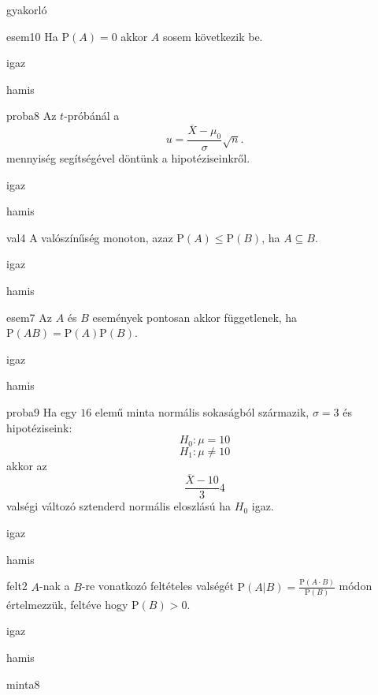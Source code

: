 \documentclass[12pt]{article}
\begin{document}
\begin{quiz}{gyakorló}

\begin{multi}[feedback={Például: legyen a kísérlet random húzás a $[0,1]$-ből és $A=\{\frac{1}{2}\}$}]{esem10}
Ha $\mathrm{P}(A)=0$ akkor $A$ sosem következik be.
\item igaz
\item* hamis
\end{multi}
\begin{multi}[feedback={A fenti formula a $u$-próba ún. próbastatisztikája.}]{proba8}
Az $t$-próbánál a 
$$
u=\frac{\overline{X}-\mu_0}{\sigma}\sqrt{n}.
$$
mennyiség segítségével döntünk a hipotéziseinkről.
\item igaz
\item* hamis
\end{multi}
\begin{multi}[feedback={$B=A\cup (B\setminus A)$+additívitás}]{val4}
A valószínűség monoton, azaz $\mathrm{P}(A)\le \mathrm{P}(B)$, ha $A\subseteq B$.
\item* igaz
\item hamis
\end{multi}
\begin{multi}[feedback={Definíció.}]{esem7}
Az $A$ és $B$ események pontosan akkor függetlenek, ha $\mathrm{P}(AB)=\mathrm{P}(A)\mathrm{P}(B)$.
\item* igaz
\item hamis
\end{multi}
\begin{multi}[feedback={Igen, éppen ez alapján tudunk dönteni. Ahhoz képest hogy sztenderd normális átlagos, tipikus értéket, vagy kiugró, extrém értéket látunk.}]{proba9}
Ha egy $16$ elemű minta normális sokaságból származik, $\sigma=3$ és hipotéziseink:
$$
H_0: \mu=10
$$
$$
H_1: \mu\neq 10
$$
akkor az 
$$
\frac{\overline{X}-10}{3}4
$$
valségi változó sztenderd normális eloszlású ha $H_0$ igaz.
\item* igaz
\item hamis
\end{multi}
\begin{multi}[feedback={Def.}]{felt2}
$A$-nak a $B$-re vonatkozó feltételes valségét $\mathrm{P}(A|B)=\frac{\mathrm{P}(A\cdot B)}{\mathrm{P}(B)}$ módon értelmezzük, feltéve hogy $\mathrm{P}(B)>0$.
\item* igaz
\item hamis
\end{multi}
\begin{multi}[feedback={Az $s^2$ torzítatlan becslése a sokasági (elméleti) szórásnégyzetnek}]{minta8}

\end{multi}
\end{quiz}
\end{document}
